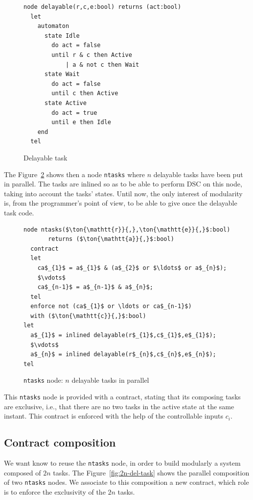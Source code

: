 \documentclass[a4paper]{article}
\begin{document}
\begin{figure}[htb]
\begin{lstlisting}
node delayable(r,c,e:bool) returns (act:bool)
  let
    automaton
      state Idle
        do act = false
        until r & c then Active
            | a & not c then Wait
      state Wait
        do act = false
        until c then Active
      state Active
        do act = true
        until e then Idle
    end
  tel
\end{lstlisting}
\caption{Delayable task}
\label{fig:del-task}
\end{figure}

The Figure~\ref{fig:n-del-task} shows then a node \texttt{ntasks} where $n$
delayable tasks have been put in parallel. The tasks are inlined so as to be
able to perform DSC on this node, taking into account the tasks' states. Until
now, the only interest of modularity is, from the programmer's point of view, to
be able to give once the delayable task code.

\begin{figure}[htb]
\begin{lstlisting}
node ntasks($\ton{\mathtt{r}}{,},\ton{\mathtt{e}}{,}$:bool)
       returns ($\ton{\mathtt{a}}{,}$:bool)
  contract
  let
    ca$_{1}$ = a$_{1}$ & (a$_{2}$ or $\ldots$ or a$_{n}$);
    $\vdots$
    ca$_{n-1}$ = a$_{n-1}$ & a$_{n}$;
  tel
  enforce not (ca$_{1}$ or \ldots or ca$_{n-1}$) 
  with ($\ton{\mathtt{c}}{,}$:bool)
let
  a$_{1}$ = inlined delayable(r$_{1}$,c$_{1}$,e$_{1}$); 
  $\vdots$
  a$_{n}$ = inlined delayable(r$_{n}$,c$_{n}$,e$_{n}$); 
tel
\end{lstlisting}
\caption{\texttt{ntasks} node: $n$ delayable tasks in parallel}
\label{fig:n-del-task}
\end{figure}

This \texttt{ntasks} node is provided with a contract, stating that its
composing tasks are exclusive, i.e., that there are no two tasks in the active
state at the same instant. This contract is enforced with the help of the
controllable inputs $c_i$.

\subsection{Contract composition}
\label{sec:contract-composition}

We want know to reuse the \texttt{ntasks} node, in order to build modularly a
system composed of $2n$ tasks. The Figure~\ref{fig:2n-del-task} shows the
parallel composition of two \texttt{ntasks} nodes. We associate to this
composition a new contract, which role is to enforce the exclusivity of the $2n$
tasks.
\end{document}
